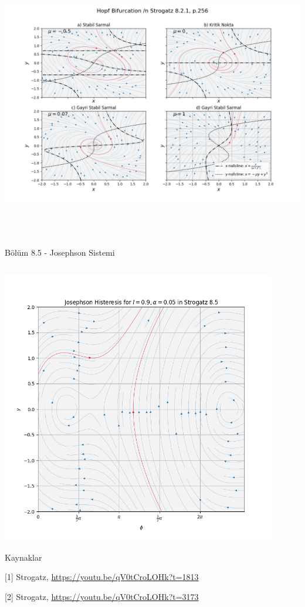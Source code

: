 \documentclass[12pt,fleqn]{article}\usepackage{../../common}
\begin{document}
\includegraphics[height=12cm]{13_12.png}

Bölüm 8.5 - Josephson Sistemi

\inputminted[fontsize=\footnotesize]{python}{sec.8.5.py}

\includegraphics[height=12cm]{13_13.png}

Kaynaklar

[1] Strogatz, \url{https://youtu.be/qV0tCroLOHk?t=1813}

[2] Strogatz, \url{https://youtu.be/qV0tCroLOHk?t=3173}
\end{document}

